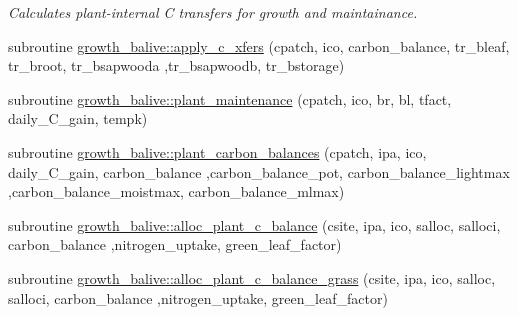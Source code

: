 \begin{DoxyCompactItemize}
\begin{DoxyCompactList}\small\item\em Calculates plant-\/internal C transfers for growth and maintainance. \end{DoxyCompactList}\item 
subroutine \hyperlink{namespacegrowth__balive_a35d46b7fc86c4cecfe31abbc36713da2}{growth\+\_\+balive\+::apply\+\_\+c\+\_\+xfers} (cpatch, ico, carbon\+\_\+balance, tr\+\_\+bleaf, tr\+\_\+broot, tr\+\_\+bsapwooda                                                                                                                               ,tr\+\_\+bsapwoodb, tr\+\_\+bstorage)
\item 
subroutine \hyperlink{namespacegrowth__balive_af977e6b599dfde9155a3ab3cb7175f16}{growth\+\_\+balive\+::plant\+\_\+maintenance} (cpatch, ico, br, bl, tfact, daily\+\_\+\+C\+\_\+gain, tempk)
\item 
subroutine \hyperlink{namespacegrowth__balive_a9b1459d871399785ed2a6ec35e083b17}{growth\+\_\+balive\+::plant\+\_\+carbon\+\_\+balances} (cpatch, ipa, ico, daily\+\_\+\+C\+\_\+gain, carbon\+\_\+balance                                                                                                                                                                                       ,carbon\+\_\+balance\+\_\+pot, carbon\+\_\+balance\+\_\+lightmax                                                                                                                                                                                       ,carbon\+\_\+balance\+\_\+moistmax, carbon\+\_\+balance\+\_\+mlmax)
\item 
subroutine \hyperlink{namespacegrowth__balive_aa34feeb938e58aab6d26db893e10aff3}{growth\+\_\+balive\+::alloc\+\_\+plant\+\_\+c\+\_\+balance} (csite, ipa, ico, salloc, salloci, carbon\+\_\+balance                                                                                                                                                                                   ,nitrogen\+\_\+uptake, green\+\_\+leaf\+\_\+factor)
\item 
subroutine \hyperlink{namespacegrowth__balive_ab77d0ec4f42b787f4ea60352eb81e7ef}{growth\+\_\+balive\+::alloc\+\_\+plant\+\_\+c\+\_\+balance\+\_\+grass} (csite, ipa, ico, salloc, salloci, carbon\+\_\+balance                                                                                                                                                           ,nitrogen\+\_\+uptake, green\+\_\+leaf\+\_\+factor)
\item 

\end{DoxyCompactItemize}
